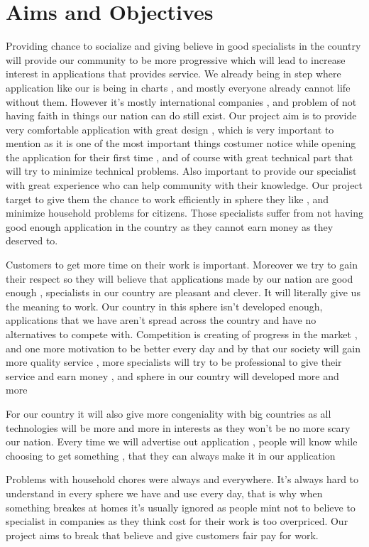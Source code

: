 \section{Aims and Objectives}
\hspace{7mm}Providing chance to socialize and giving believe in good specialists in the country will provide our community to be more progressive which will lead to increase interest in applications that provides service. We already being in step where application like our is being in charts , and mostly everyone already cannot life without them. However it's mostly international companies , and problem of not having faith in things our nation can do still exist. Our project aim is to provide very comfortable application with great design , which is very important to mention as it is one of the most important things costumer notice while opening the application for their first time , and of course with great technical part that will try to minimize technical problems. 
Also important to provide our specialist with great experience who can help community with their knowledge. Our project target to give them the chance to work efficiently in sphere they like , and minimize household problems for citizens. Those specialists suffer from not having good enough application in the country as they cannot earn money as they deserved to.


Customers to get more time on their work is important. Moreover we try to gain their respect so they will believe that applications made by our nation are good enough , specialists in our country are pleasant and clever. It will literally give us the meaning to work. Our country in this sphere isn't developed enough, applications that we have aren’t spread across the country and have no alternatives to compete with. Competition is creating of progress in the market , and one more motivation to be better every day and by that our society will gain more quality service , more specialists will try to be professional to give their service and earn money , and sphere in our country will developed more and more


For our country it will also give more congeniality with big countries as all technologies will be more and more in interests as they won’t be no more scary our nation. Every time we will advertise out application , people will know while choosing to get something , that they can always make it in our application


Problems with household chores were always and everywhere. It's always hard to understand in every sphere we have and use every day, that is why when something breakes at homes it's usually ignored as people mint not to believe to specialist in companies as they think cost for their work is too overpriced. Our project aims to break that believe and give customers fair pay for work.

